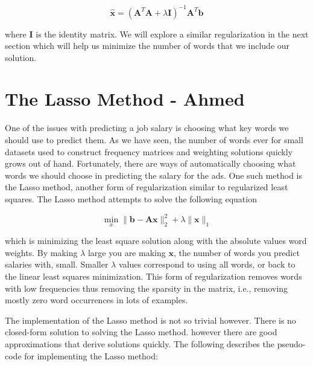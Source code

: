 \documentclass[12pt]{article}
\begin{document}
    \begin{equation}
        \bm{\hat{x}} = (\bm{A}^{T}\bm{A} + \lambda \bm{I})^{-1}\bm{A}^T\bm{b}
    \end{equation}

    \noindent where $\bm{I}$ is the identity matrix. We will explore a similar
    regularization in the next section which will help us minimize the number
    of words that we include our solution.

\section{The Lasso Method - Ahmed}

    One of the issues with predicting a job salary is choosing what key words
    we should use to predict them. As we have seen, the number of words ever
    for small datasets used to construct frequency matrices and weighting
    solutions quickly grows out of hand. Fortunately, there are ways of
    automatically choosing what words we should choose in predicting the salary
    for the ads. One such method is the Lasso method, another form of
    regularization similar to regularized least squares. The Lasso method
    attempts to solve the following equation

    \begin{equation}
        \min_x \|\bm{b} - \bm{Ax}\|_2^2 + \lambda\|\bm{x}\|_1
    \end{equation}

    \noindent which is minimizing the least square solution along with the
    absolute values word weights. By making $\lambda$ large you are making
    $\bm{x}$, the number of words you predict salaries with, small. Smaller
    $\lambda$ values correspond to using all words, or back to the linear least
    squares minimization. This form of regularization removes words with low
    frequencies thus removing the sparsity in the matrix, i.e., removing mostly
    zero word occurrences in lots of examples. 

    The implementation of the Lasso method is not so trivial however. There is
    no closed-form solution to solving the Lasso method. however there are good
    approximations that derive solutions quickly. The following describes the
    pseudo-code for implementing the Lasso method:
\end{document}
